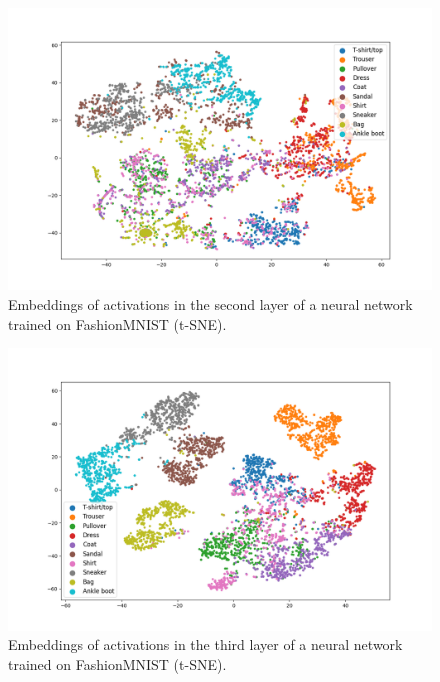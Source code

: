 \documentclass{article}
\begin{document}
\begin{figure}
  \centering
    \includegraphics[width=1.0\textwidth]{../../out/activations_cnn/fmnist/t-sne/trained/plot_l2_f0.png}
    \caption{Embeddings of activations in the second layer of a neural network trained on FashionMNIST (t-SNE).}
\end{figure}

\begin{figure}
  \centering
    \includegraphics[width=1.0\textwidth]{../../out/activations_cnn/fmnist/t-sne/trained/plot_l3.png}
    \caption{Embeddings of activations in the third layer of a neural network trained on FashionMNIST (t-SNE).}
\end{figure}
\end{document}
